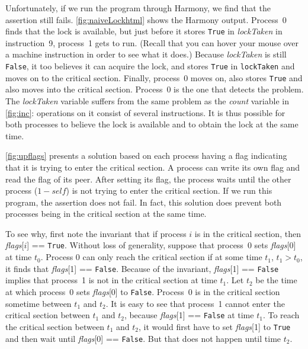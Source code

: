 \documentclass{report}
\begin{document}
Unfortunately, if we run the program through Harmony,
we find that the assertion still fails.
\autoref{fig:naiveLockhtml} shows the Harmony output.
Process~0 finds that the lock is available, but just before it stores
\texttt{True} in \textit{lockTaken} in instruction~9, process~1 gets
to run.
(Recall that you can hover your mouse over a machine instruction in order
to see what it does.)
Because \textit{lockTaken} is still \texttt{False}, it too
believes it can acquire the lock, and stores \texttt{True} in
\texttt{lockTaken} and moves on to the critical section.
Finally, process~0 moves on, also stores \texttt{True} and also moves
into the critical section.  Process~0 is the one that detects the
problem.
The \textit{lockTaken} variable
suffers from the same problem as the \textit{count} variable
in \autoref{fig:inc}: operations
on it consist of several instructions.  It is thus possible
for both processes to believe the lock is available and to obtain the lock
at the same time.

\autoref{fig:upflags} presents a solution based on each process having
a flag indicating that it is trying to enter the critical section.
A process can write its own flag and read the flag of its peer.
After setting its flag, the process waits until the other process
($1 - \mathit{self}$) is not trying to enter the critical section.
If we run this program, the assertion does not fail.  In fact, this
solution does prevent both processes being in the critical section at
the same time.

To see why, first note the invariant that if process $i$ is in the
critical section, then \textit{flags}[$i$] == \texttt{True}.
Without loss of generality,
suppose that process~0 sets \textit{flags}[0] at time $t_0$.
Process 0 can only reach the critical section if at some time $t_1$,
$t_1 > t_0$, it finds that \textit{flags}[1] == \texttt{False}.
Because of the invariant, \textit{flags}[1] == \texttt{False} implies that
process~1 is not in the critical section at time $t_1$.
Let $t_2$ be the time at which process~0 sets \textit{flags}[0]
to \texttt{False}.  Process~0 is in the critical section sometime
between $t_1$ and $t_2$.
It is easy to see that process~1 cannot enter the critical section
between $t_1$ and $t_2$, because \textit{flags}[1] == \texttt{False} at
time $t_1$.  To reach the critical section between $t_1$ and $t_2$,
it would first have to set \textit{flags}[1] to \texttt{True} and
then wait until \textit{flags}[0] == \texttt{False}.  But that does not happen
until time $t_2$.
\end{document}
